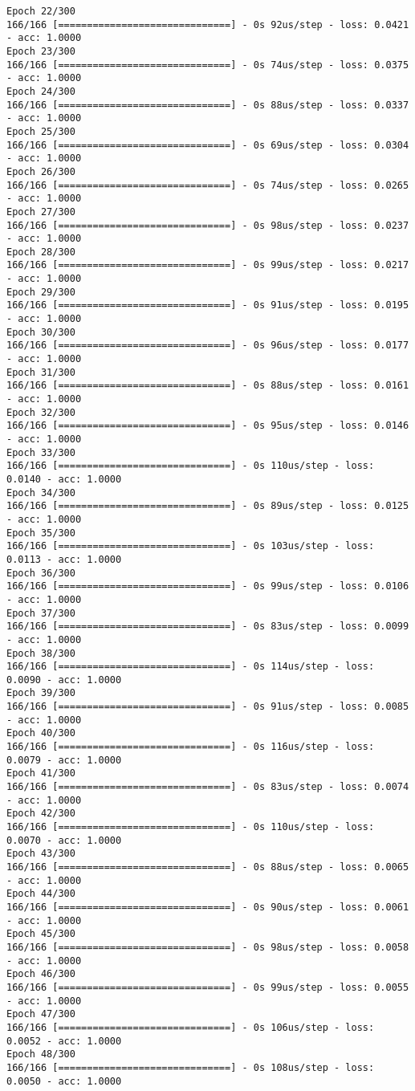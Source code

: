 \documentclass[11pt]{article}
\begin{document}
\begin{Verbatim}[commandchars=\\\{\}]
Epoch 22/300
166/166 [==============================] - 0s 92us/step - loss: 0.0421 - acc: 1.0000
Epoch 23/300
166/166 [==============================] - 0s 74us/step - loss: 0.0375 - acc: 1.0000
Epoch 24/300
166/166 [==============================] - 0s 88us/step - loss: 0.0337 - acc: 1.0000
Epoch 25/300
166/166 [==============================] - 0s 69us/step - loss: 0.0304 - acc: 1.0000
Epoch 26/300
166/166 [==============================] - 0s 74us/step - loss: 0.0265 - acc: 1.0000
Epoch 27/300
166/166 [==============================] - 0s 98us/step - loss: 0.0237 - acc: 1.0000
Epoch 28/300
166/166 [==============================] - 0s 99us/step - loss: 0.0217 - acc: 1.0000
Epoch 29/300
166/166 [==============================] - 0s 91us/step - loss: 0.0195 - acc: 1.0000
Epoch 30/300
166/166 [==============================] - 0s 96us/step - loss: 0.0177 - acc: 1.0000
Epoch 31/300
166/166 [==============================] - 0s 88us/step - loss: 0.0161 - acc: 1.0000
Epoch 32/300
166/166 [==============================] - 0s 95us/step - loss: 0.0146 - acc: 1.0000
Epoch 33/300
166/166 [==============================] - 0s 110us/step - loss: 0.0140 - acc: 1.0000
Epoch 34/300
166/166 [==============================] - 0s 89us/step - loss: 0.0125 - acc: 1.0000
Epoch 35/300
166/166 [==============================] - 0s 103us/step - loss: 0.0113 - acc: 1.0000
Epoch 36/300
166/166 [==============================] - 0s 99us/step - loss: 0.0106 - acc: 1.0000
Epoch 37/300
166/166 [==============================] - 0s 83us/step - loss: 0.0099 - acc: 1.0000
Epoch 38/300
166/166 [==============================] - 0s 114us/step - loss: 0.0090 - acc: 1.0000
Epoch 39/300
166/166 [==============================] - 0s 91us/step - loss: 0.0085 - acc: 1.0000
Epoch 40/300
166/166 [==============================] - 0s 116us/step - loss: 0.0079 - acc: 1.0000
Epoch 41/300
166/166 [==============================] - 0s 83us/step - loss: 0.0074 - acc: 1.0000
Epoch 42/300
166/166 [==============================] - 0s 110us/step - loss: 0.0070 - acc: 1.0000
Epoch 43/300
166/166 [==============================] - 0s 88us/step - loss: 0.0065 - acc: 1.0000
Epoch 44/300
166/166 [==============================] - 0s 90us/step - loss: 0.0061 - acc: 1.0000
Epoch 45/300
166/166 [==============================] - 0s 98us/step - loss: 0.0058 - acc: 1.0000
Epoch 46/300
166/166 [==============================] - 0s 99us/step - loss: 0.0055 - acc: 1.0000
Epoch 47/300
166/166 [==============================] - 0s 106us/step - loss: 0.0052 - acc: 1.0000
Epoch 48/300
166/166 [==============================] - 0s 108us/step - loss: 0.0050 - acc: 1.0000

\end{Verbatim}
\end{document}
